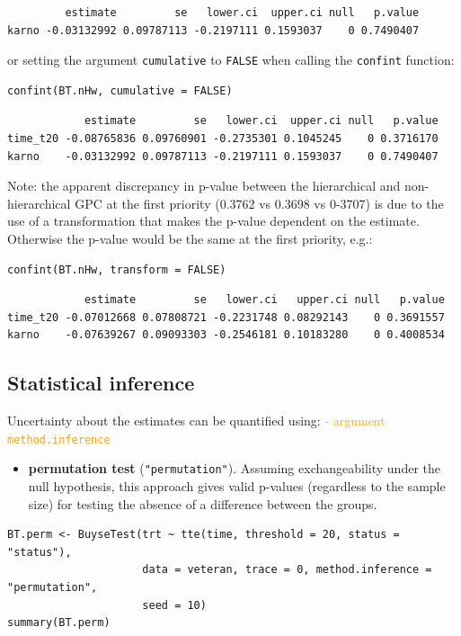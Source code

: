 \documentclass[12pt]{article}
\begin{document}
\begin{verbatim}
         estimate         se   lower.ci  upper.ci null   p.value
karno -0.03132992 0.09787113 -0.2197111 0.1593037    0 0.7490407
\end{verbatim}


or setting the argument \texttt{cumulative} to \texttt{FALSE} when calling the
\texttt{confint} function:
\lstset{language=r,label= ,caption= ,captionpos=b,numbers=none}
\begin{lstlisting}
confint(BT.nHw, cumulative = FALSE)
\end{lstlisting}

\begin{verbatim}
            estimate         se   lower.ci  upper.ci null   p.value
time_t20 -0.08765836 0.09760901 -0.2735301 0.1045245    0 0.3716170
karno    -0.03132992 0.09787113 -0.2197111 0.1593037    0 0.7490407
\end{verbatim}


\bigskip

Note: the apparent discrepancy in p-value between the hierarchical and
non-hierarchical GPC at the first priority (0.3762 vs 0.3698 vs
0-3707) is due to the use of a transformation that makes the p-value
dependent on the estimate. Otherwise the p-value would be the same at
the first priority, e.g.:
\lstset{language=r,label= ,caption= ,captionpos=b,numbers=none}
\begin{lstlisting}
confint(BT.nHw, transform = FALSE)
\end{lstlisting}

\begin{verbatim}
            estimate         se   lower.ci   upper.ci null   p.value
time_t20 -0.07012668 0.07808721 -0.2231748 0.08292143    0 0.3691557
karno    -0.07639267 0.09093303 -0.2546181 0.10183280    0 0.4008534
\end{verbatim}



\clearpage

\subsection{Statistical inference}
\label{sec:org57808b1}

Uncertainty about the estimates can be quantified using: \hfill \textcolor{orange}{- argument \texttt{method.inference}}
\begin{itemize}
\item \textbf{permutation test} (\texttt{"permutation"}). Assuming exchangeability under the null hypothesis,
this approach gives valid p-values (regardless to the sample size)
for testing the absence of a difference between the groups.
\end{itemize}
\lstset{language=r,label= ,caption= ,captionpos=b,numbers=none}
\begin{lstlisting}
BT.perm <- BuyseTest(trt ~ tte(time, threshold = 20, status = "status"),
                     data = veteran, trace = 0, method.inference = "permutation",
                     seed = 10) 
summary(BT.perm)
\end{lstlisting}
\end{document}
